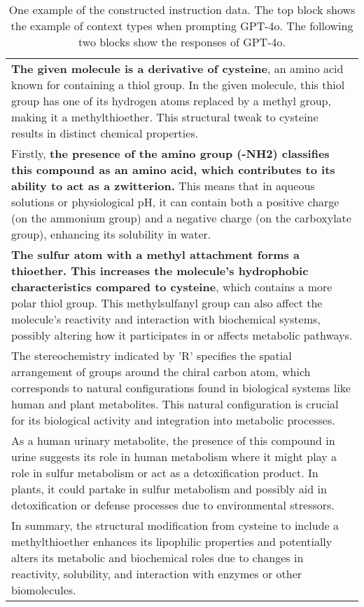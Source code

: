 \begin{table*}[h!]
\begin{tcolorbox}[colframe=gray,colback=white,boxrule=1pt,arc=0.6em,boxsep=0mm,left=5.pt,right=15pt]
\renewcommand{\arraystretch}{1.2}
\begin{tabular}{p{}}
    \textbf{The given molecule is a derivative of cysteine}, an amino acid known for containing a thiol group. In the given molecule, this thiol group has one of its hydrogen atoms replaced by a methyl group, making it a methylthioether. This structural tweak to cysteine results in distinct chemical properties. \\
    Firstly, \textbf{the presence of the amino group (-NH2) classifies this compound as an amino acid, which contributes to its ability to act as a zwitterion.} This means that in aqueous solutions or physiological pH, it can contain both a positive charge (on the ammonium group) and a negative charge (on the carboxylate group), enhancing its solubility in water. \\
    \textbf{The sulfur atom with a methyl attachment forms a thioether. This increases the molecule's hydrophobic characteristics compared to cysteine}, which contains a more polar thiol group. This methylsulfanyl group can also affect the molecule's reactivity and interaction with biochemical systems, possibly altering how it participates in or affects metabolic pathways.\\
    The stereochemistry indicated by 'R' specifies the spatial arrangement of groups around the chiral carbon atom, which corresponds to natural configurations found in biological systems like human and plant metabolites. This natural configuration is crucial for its biological activity and integration into metabolic processes.\\
    As a human urinary metabolite, the presence of this compound in urine suggests its role in human metabolism where it might play a role in sulfur metabolism or act as a detoxification product. In plants, it could partake in sulfur metabolism and possibly aid in detoxification or defense processes due to environmental stressors.\\
    In summary, the structural modification from cysteine to include a methylthioether enhances its lipophilic properties and potentially alters its metabolic and biochemical roles due to changes in reactivity, solubility, and interaction with enzymes or other biomolecules.\\
\end{tabular}
\end{tcolorbox}
\vspace{-0.1in}
\caption{One example of the constructed instruction data. The top block shows the example of context types when prompting GPT-4o. The following two blocks show the responses of GPT-4o.}
\label{app:tab:data_example_full_part1}
\end{table*}
